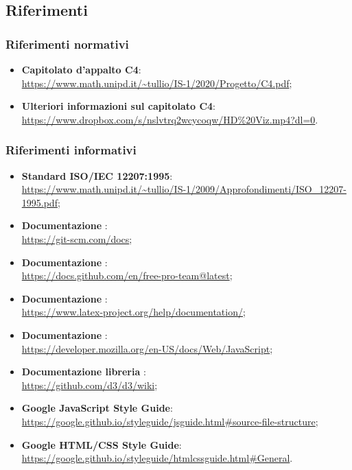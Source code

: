 \subsection{Riferimenti}

\subsubsection{Riferimenti normativi}

\begin{itemize}
    \item \textbf{Capitolato d'appalto \textsc{C4}}: \\
    \url{https://www.math.unipd.it/~tullio/IS-1/2020/Progetto/C4.pdf};
    \item \textbf{Ulteriori informazioni sul capitolato C4}: \\
    \url{https://www.dropbox.com/s/nslvtrq2wcycoqw/HD\%20Viz.mp4?dl=0}.
\end{itemize}

\subsubsection{Riferimenti informativi}
\begin{itemize}
    \item \textbf{Standard ISO/IEC 12207:1995}: \\
    \url{https://www.math.unipd.it/~tullio/IS-1/2009/Approfondimenti/ISO_12207-1995.pdf};
    \item \textbf{Documentazione }: \\
    \url{https://git-scm.com/docs};
    \item \textbf{Documentazione }: \\
    \url{https://docs.github.com/en/free-pro-team@latest};
    \item \textbf{Documentazione \glossario{\LaTeX}}: \\
    \url{https://www.latex-project.org/help/documentation/};
    \item \textbf{Documentazione }: \\
    \url{https://developer.mozilla.org/en-US/docs/Web/JavaScript};
    \item \textbf{Documentazione libreria }: \\
    \url{https://github.com/d3/d3/wiki};
	\item \textbf{Google JavaScript Style Guide}: \\
	\url{https://google.github.io/styleguide/jsguide.html#source-file-structure};
	\item \textbf{Google HTML/CSS Style Guide}: \\
	\url{https://google.github.io/styleguide/htmlcssguide.html#General}.
\end{itemize}
